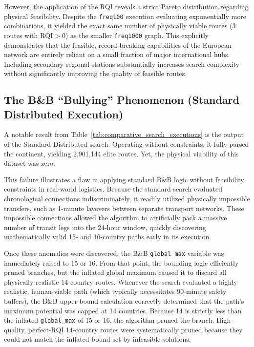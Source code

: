 \medskip

However, the application of the RQI reveals a strict Pareto distribution regarding physical feasibility. Despite the \texttt{freq100} execution evaluating exponentially more combinations, it yielded the exact same number of physically viable routes (3 routes with $\mathrm{RQI} > 0$) as the smaller \texttt{freq1000} graph. This explicitly demonstrates that the feasible, record-breaking capabilities of the European network are entirely reliant on a small fraction of major international hubs. Including secondary regional stations substantially increases search complexity without significantly improving the quality of feasible routes.

\subsection{The B\&B ``Bullying'' Phenomenon (Standard Distributed Execution)}
\label{subsec:bb_bullying_phenomenon}

A notable result from Table~\ref{tab:comparative_search_executions} is the output of the Standard Distributed search. Operating without constraints, it fully parsed the continent, yielding 2,901,144 elite routes. Yet, the physical viability of this dataset was zero.

\medskip

This failure illustrates a flaw in applying standard B\&B logic without feasibility constraints in real-world logistics. Because the standard search evaluated chronological connections indiscriminately, it readily utilized physically impossible transfers, such as 1-minute layovers between separate transport networks. These impossible connections allowed the algorithm to artificially pack a massive number of transit legs into the 24-hour window, quickly discovering mathematically valid 15- and 16-country paths early in its execution.

\medskip

Once these anomalies were discovered, the B\&B \texttt{global\_max} variable was immediately raised to 15 or 16. From that point, the bounding logic efficiently pruned branches, but the inflated global maximum caused it to discard all physically realistic 14-country routes. Whenever the search evaluated a highly realistic, human-viable path (which typically necessitates 90-minute safety buffers), the B\&B upper-bound calculation correctly determined that the path's maximum potential was capped at 14 countries. Because 14 is strictly less than the inflated \texttt{global\_max} of 15 or 16, the algorithm pruned the branch. High-quality, perfect-RQI 14-country routes were systematically pruned because they could not match the inflated bound set by infeasible solutions.

